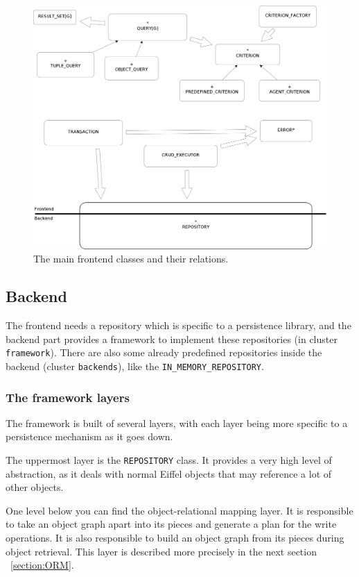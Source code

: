 \begin{figure} [h]
\centering
\includegraphics[trim= 0mm -10mm 0mm -10mm,clip, width = 13cm] {includes/frontend.png}
\caption{The main frontend classes and their relations.}
\label{fig:frontend_classes}
\end{figure}


\subsection{Backend}

The frontend needs a repository which is specific to a persistence library, and the backend part provides a framework to implement these repositories (in cluster \lstinline!framework!).
There are also some already predefined repositories inside the backend (cluster \lstinline!backends!), like the \lstinline!IN_MEMORY_REPOSITORY!.

\subsubsection{The framework layers}

The framework is built of several layers, with each layer being more specific to a persistence mechanism as it goes down.

The uppermost layer is the \lstinline!REPOSITORY! class. 
It provides a very high level of abstraction, as it deals with normal Eiffel objects that may reference a lot of other objects.

One level below you can find the object-relational mapping layer.
It is responsible to take an object graph apart into its pieces and generate a plan for the write operations.
It is also responsible to build an object graph from its pieces during object retrieval.
This layer is described more precisely in the next section ~\ref{section:ORM}.


